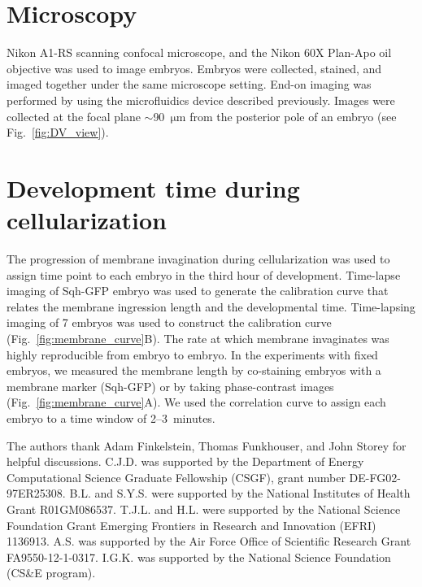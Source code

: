 \documentclass{pnastwo}
\newcommand{\fig}[0]{Fig.}
\begin{document}
\begin{article}
\begin{materials}
\section{Microscopy}
%
Nikon A1-RS scanning confocal microscope, and the Nikon 60X Plan-Apo oil objective was used to image embryos. Embryos were collected, stained, and imaged together under the same microscope setting. End-on imaging was performed by using the microfluidics device described previously. Images were collected at the focal plane $\sim$90~$\mathrm{\mu m}$ from the posterior pole of an embryo (see \fig~\ref{fig:DV_view}). 

\section{Development time during cellularization} 
%
The progression of membrane invagination during cellularization was used to assign time point to each embryo in the third hour of development. Time-lapse imaging of Sqh-GFP embryo was used to generate the calibration curve that relates the membrane ingression length and the developmental time. Time-lapsing imaging of 7 embryos was used to construct the calibration curve (\fig~\ref{fig:membrane_curve}B). The rate at which membrane invaginates was highly reproducible from embryo to embryo. In the experiments with fixed embryos, we measured the membrane length by co-staining embryos with a membrane marker (Sqh-GFP) or by taking phase-contrast images (\fig~\ref{fig:membrane_curve}A). We used the correlation curve to assign each embryo to a time window of 2--3~minutes. 

\end{materials}




\begin{acknowledgments}
The authors thank Adam Finkelstein,  Thomas Funkhouser, and John Storey for helpful discussions. 
%
C.J.D. was supported by the Department of Energy Computational Science Graduate Fellowship (CSGF), grant number DE-FG02-97ER25308.
%
B.L. and S.Y.S. were supported by the National Institutes of Health Grant R01GM086537. 
%
T.J.L. and H.L. were supported by the National Science Foundation Grant Emerging Frontiers in Research and Innovation (EFRI) 1136913.
%
A.S. was supported by the Air Force Office of Scientific Research Grant
FA9550-12-1-0317.
%
I.G.K. was supported by the National Science Foundation (CS\&E program).
\end{acknowledgments}


\end{article}
\end{document}
